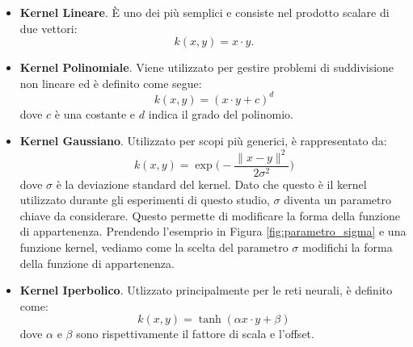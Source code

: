 \documentclass[a4paper,12pt]{report}
\begin{document}
\begin{itemize}
    \item \textbf{Kernel Lineare}. \`E uno dei più semplici e consiste nel prodotto scalare di due vettori:
    \begin{equation*}
        k(x,y) = x \cdot y.
    \end{equation*}

    \item  \textbf{Kernel Polinomiale}. Viene utilizzato per gestire problemi di suddivisione non lineare ed è definito come segue:
    \begin{equation*}
        k(x,y) = (x \cdot y + c)^{d}
    \end{equation*}
    \noindent dove $c$ è  una costante e $d$ indica il grado del polinomio.

    \item \textbf{Kernel Gaussiano}. Utilizzato per scopi più generici, è rappresentato da:
    \begin{equation*}
        k(x,y) = \exp{\bigg(-\frac{\|x-y\|^{2}}{2\sigma^{2}}\bigg)}
    \end{equation*}
    \noindent dove $\sigma$ è la deviazione standard del kernel. Dato che questo è il kernel utilizzato durante gli esperimenti di questo studio, $\sigma$ diventa un parametro chiave da considerare. Questo permette di modificare la forma della funzione di appartenenza. Prendendo l'esemprio in Figura \ref{fig:parametro_sigma} e una funzione kernel, vediamo come la scelta del parametro $\sigma$ modifichi la forma della funzione di appartenenza.

    \item  \textbf{Kernel Iperbolico}. Utlizzato principalmente per le reti neurali, è definito come:
    \begin{equation*}
        k(x,y) = \tanh (\alpha x\cdot y + \beta)
    \end{equation*}
    \noindent dove $\alpha$ e $\beta$ sono rispettivamente il fattore di scala e l'offset.
\end{itemize}
\end{document}
